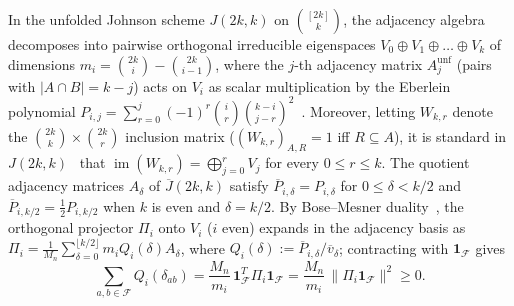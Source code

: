 \documentclass[11pt,reqno]{amsart}
\theoremstyle{definition}
\theoremstyle{remark}
\newcommand{\Jbar}{\overline{J}}
\newcommand{\F}{\mathcal{F}}
\begin{document}
In the unfolded Johnson scheme $J(2k,k)$ on $\binom{[2k]}{k}$, the adjacency algebra decomposes into pairwise orthogonal irreducible eigenspaces $V_0 \oplus V_1 \oplus \dots \oplus V_k$ of dimensions $m_i = \binom{2k}{i} - \binom{2k}{i-1}$, where the $j$-th adjacency matrix $A_j^{\mathrm{unf}}$ (pairs with $|A\cap B| = k - j$) acts on $V_i$ as scalar multiplication by the Eberlein polynomial $P_{i,j} = \sum_{r=0}^j (-1)^r \binom{i}{r}\binom{k-i}{j-r}^2$~\cite{Delsarte1973,BannaiIto1984}. Moreover, letting $W_{k,r}$ denote the $\binom{2k}{k} \times \binom{2k}{r}$ inclusion matrix ($(W_{k,r})_{A,R} = 1$ iff $R \subseteq A$), it is standard in $J(2k,k)$~\cite{Delsarte1973} that $\operatorname{im}(W_{k,r}) = \bigoplus_{j=0}^r V_j$ for every $0 \le r \le k$. The quotient adjacency matrices $A_\delta$ of $\Jbar(2k,k)$ satisfy $\overline{P}_{i,\delta} = P_{i,\delta}$ for $0 \le \delta < k/2$ and $\overline{P}_{i,k/2} = \frac{1}{2}P_{i,k/2}$ when $k$ is even and $\delta = k/2$. By Bose--Mesner duality~\cite{Delsarte1973,BannaiIto1984}, the orthogonal projector $\Pi_i$ onto $V_i$ ($i$ even) expands in the adjacency basis as $\Pi_i = \frac{1}{M_n} \sum_{\delta=0}^{\lfloor k/2 \rfloor} m_i Q_i(\delta) A_\delta$, where $Q_i(\delta) := \overline{P}_{i,\delta}/\overline{v}_\delta$; contracting with $\mathbf{1}_{\F}$ gives
\begin{equation}\label{eq:bose_mesner_sum}
\sum_{a,b \in \F} Q_i(\delta_{ab}) = \frac{M_n}{m_i}\,\mathbf{1}_{\F}^T \Pi_i \mathbf{1}_{\F} = \frac{M_n}{m_i}\,\|\Pi_i \mathbf{1}_{\F}\|^2 \ge 0.
\end{equation}
\end{document}
